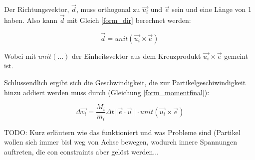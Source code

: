 Der Richtungsvektor, $\vec{d}$, muss orthogonal zu $\vec{u_i}$ und $\vec{e}$ sein und eine Länge von 1 haben. Also kann $\vec{d}$ mit Gleich \ref{form_dir} berechnet werden:

\begin{equation}
\vec{d} = unit(\vec{u_i} \times \vec{e} )
\label{form_dir}
\end{equation}

Wobei mit $unit(...)$ der Einheitsvektor aus dem Kreuzprodukt $\vec{u_i} \times \vec{e} $ gemeint ist.

Schlussendlich ergibt sich die Geschwindigkeit, die zur Partikelgeschiwindigkeit hinzu addiert werden muss durch (Gleichung \ref{form_momentfinal}):

\begin{equation}
\Delta \vec{v_i} =  \dfrac{M_i}{m_i} \Delta t ||\vec{e} \cdot \vec{u}|| \cdot unit(\vec{u_i} \times \vec{e} )
\label{form_momentfinal}
\end{equation}

TODO: Kurz erläutern wie das funktioniert und was Probleme sind (Partikel wollen sich immer bisl weg von Achse bewegen, wodurch innere Spannungen auftreten, die con constraints aber gelöst werden...


